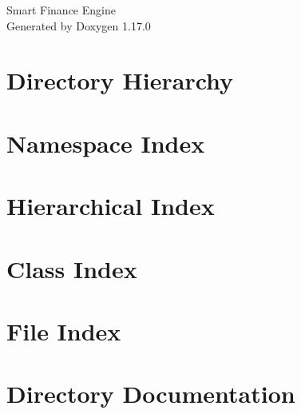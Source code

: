 \documentclass[twoside]{book}
\newcommand{\+}{\discretionary{\mbox{\scriptsize$\hookleftarrow$}}{}{}}
\newcommand{\clearemptydoublepage}{%
    \newpage{\pagestyle{empty}\cleardoublepage}%
  }
\begin{document}
  \raggedbottom
    \hypersetup{pageanchor=false,
                bookmarksnumbered=true,
                pdfencoding=unicode
               }
  \begin{titlepage}
  \vspace*{7cm}
  \begin{center}%
  {\Large Smart Finance Engine}\\
  \vspace*{1cm}
  {\large Generated by Doxygen 1.17.0}\\
  \end{center}
  \end{titlepage}
  \clearemptydoublepage
  \tableofcontents
  \clearemptydoublepage
  \hypersetup{pageanchor=true}

\chapter{Directory Hierarchy}

\chapter{Namespace Index}

\chapter{Hierarchical Index}

\chapter{Class Index}

\chapter{File Index}

\chapter{Directory Documentation}
























\end{document}
